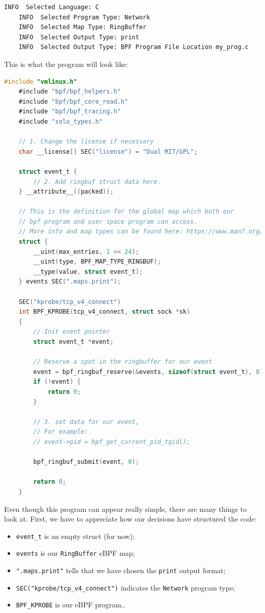\begin{lstlisting}[language=bash, caption={bee choices for first program}]
	INFO  Selected Language: C
	INFO  Selected Program Type: Network
	INFO  Selected Map Type: RingBuffer
	INFO  Selected Output Type: print
	INFO  Selected Output Type: BPF Program File Location my_prog.c
\end{lstlisting}

This is what the program will look like:

\begin{lstlisting}[language=C, caption={bee first program}]
	#include "vmlinux.h"
	#include "bpf/bpf_helpers.h"
	#include "bpf/bpf_core_read.h"
	#include "bpf/bpf_tracing.h"
	#include "solo_types.h"
	
	// 1. Change the license if necessary 
	char __license[] SEC("license") = "Dual MIT/GPL";
	
	struct event_t {
		// 2. Add ringbuf struct data here.
	} __attribute__((packed));
	
	// This is the definition for the global map which both our
	// bpf program and user space program can access.
	// More info and map types can be found here: https://www.man7.org/linux/man-pages/man2/bpf.2.html
	struct {
		__uint(max_entries, 1 << 24);
		__uint(type, BPF_MAP_TYPE_RINGBUF);
		__type(value, struct event_t);
	} events SEC(".maps.print");
	
	SEC("kprobe/tcp_v4_connect")
	int BPF_KPROBE(tcp_v4_connect, struct sock *sk)
	{
		// Init event pointer
		struct event_t *event;
		
		// Reserve a spot in the ringbuffer for our event
		event = bpf_ringbuf_reserve(&events, sizeof(struct event_t), 0);
		if (!event) {
			return 0;
		}
		
		// 3. set data for our event,
		// For example:
		// event->pid = bpf_get_current_pid_tgid();
		
		bpf_ringbuf_submit(event, 0);
		
		return 0;
	}
\end{lstlisting}

Even though this program can appear really simple, there are many things to look at.
First, we have to appreciate how our decisions have structured the code:

\begin{itemize}
	\item \verb|event_t| is an empty struct (for now);
	\item \verb|events| is our \verb|RingBuffer| eBPF map;
	\item \verb|".maps.print"| tells that we have chosen the \verb|print| output 
		format;
	\item \verb|SEC("kprobe/tcp_v4_connect")| indicates the \verb|Network| program 
		type;
	\item \verb|BPF_KPROBE| is our eBPF program..
\end{itemize}


